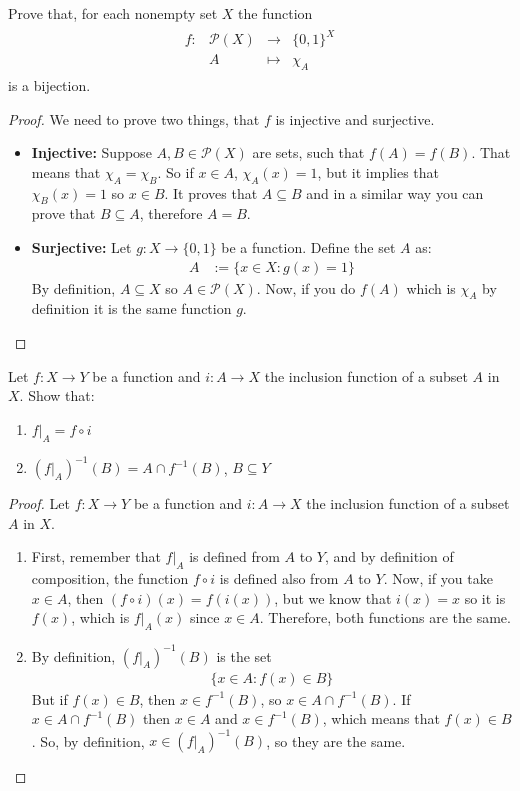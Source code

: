 \documentclass{tufte-handout}
\begin{document}
\begin{problem}
	Prove that, for each nonempty set $X$ the function
	\begin{align*}
		\begin{matrix}
			f: &\mathcal{P}(X)& \to &\{0, 1\}^X\\
			&A &\mapsto & \chi_A
		\end{matrix}
	\end{align*}
	is a bijection.
\end{problem}
\begin{proof}
	We need to prove two things, that $f$ is injective and surjective.
	\begin{itemize}
		\item \textbf{Injective:} Suppose $A, B \in \mathcal{P}(X)$ are sets, such that $f(A) = f(B)$. That means that $\chi_A = \chi_B$. So if $x \in A$, $\chi_A(x) = 1$, but it implies that $\chi_B(x) = 1$ so $x \in B$. It proves that $A\subseteq B$ and in a similar way you can prove that $B\subseteq A$, therefore $A=B$.
		\item \textbf{Surjective:} Let $g: X \to \{0, 1\}$ be a function. Define the set $A$ as:
		\begin{align*}
			A &:= \{x \in X: g(x) = 1\}
		\end{align*}
		By definition, $A \subseteq X$ so $A \in \mathcal{P}(X)$. Now, if you do $f(A)$ which is $\chi_A$ by definition it is the same function $g$.
	\end{itemize}
\end{proof}

\begin{problem}
	Let $f: X \to Y$ be a function and $i: A \to X$ the inclusion function of a subset $A$ in $X$. Show that:
	\begin{enumerate}
		\item $f|_A = f\circ i$
		\item $(f|_A)^{-1}(B) = A \cap f^{-1}(B)$, $B \subseteq Y$
	\end{enumerate}
\end{problem}
\begin{proof}
	Let $f: X \to Y$ be a function and $i: A \to X$ the inclusion function of a subset $A$ in $X$.
	\begin{enumerate}
		\item First, remember that $f|_A$ is defined from $A$ to $Y$, and by definition of composition, the function $f \circ i$ is defined also from $A$ to $Y$. Now, if you take $x \in A$, then $(f \circ i)(x) = f(i(x))$, but we know that $i(x) = x$ so it is $f(x)$, which is $f|_A(x)$ since $x \in A$. Therefore, both functions are the same.
		\item By definition, $(f|_A)^{-1}(B)$ is the set
		\begin{align*}
			\{x \in A: f(x) \in B\}
		\end{align*}
		But if $f(x) \in B$, then $x \in f^{-1}(B)$, so $x \in A \cap f^{-1}(B)$. If $x \in A \cap f^{-1}(B)$ then $x \in A$ and $x \in f^{-1}(B)$, which means that $f(x) \in B$. So, by definition, $x \in (f|_A)^{-1}(B)$, so they are the same.
	\end{enumerate}
\end{proof}
\end{document}
